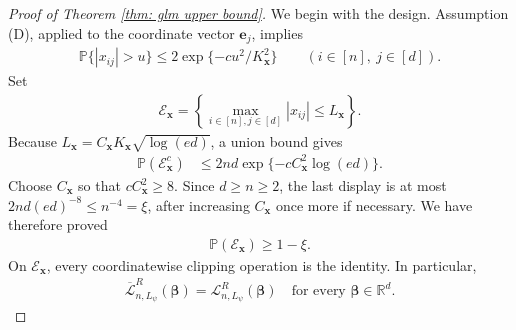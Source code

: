 \documentclass[letterpaper,12pt]{article}
\numberwithin{equation}{section}
\theoremstyle{plain}
\numberwithin{Theorem}{section}
\numberwithin{proposition}{section}
\numberwithin{Lemma}{section}
{
	\theoremstyle{definition}
	\newtheorem{Definition}{Definition}
	\newtheorem{example}{Example}
	\numberwithin{example}{section}
	\newtheorem{fact}{Fact}
	\numberwithin{fact}{section}
	\newtheorem{remark}{Remark}
}
\newcommand{\1}{\mathbbm{1}}
\def\bbeta{{\boldsymbol{\beta}}}
\def\Pr{\mathbb P}
\def\L{{\mathcal L}}
\begin{document}
\begin{proof}[Proof of Theorem \ref{thm: glm upper bound}]
We begin with the design.  Assumption (D), applied to the coordinate
vector \(\bm e_j\), implies
\begin{align*}
\Pr\{|x_{ij}|>u\}
\leq2\exp\{-cu^2/K_{\bm x}^2\}
\qquad(i\in[n],\ j\in[d]).
\end{align*}
Set
\begin{align*}
\mathcal E_{\bm x}
=\left\{\max_{i\in[n],j\in[d]}|x_{ij}|\leq L_{\bm x}\right\}.
\end{align*}
Because \(L_{\bm x}=C_{\bm x}K_{\bm x}\sqrt{\log(ed)}\), a union
bound gives
\begin{align*}
\Pr(\mathcal E_{\bm x}^c)
&\leq2nd\exp\{-cC_{\bm x}^2\log(ed)\}.
\end{align*}
Choose \(C_{\bm x}\) so that \(cC_{\bm x}^2\geq8\).  Since
\(d\geq n\geq2\), the last display is at most
\(2nd(ed)^{-8}\leq n^{-4}=\xi\), after increasing
\(C_{\bm x}\) once more if necessary.  We have therefore proved
\begin{align}
\Pr(\mathcal E_{\bm x})\geq1-\xi.                         \label{eq: repaired sparse no covariate clipping}
\end{align}
On \(\mathcal E_{\bm x}\), every coordinatewise clipping operation is
the identity.  In particular,
\begin{align}
\overline\L_{n,L_\psi}^R(\bbeta)=\L_{n,L_\psi}^R(\bbeta)
\quad\text{for every }\bbeta\in\mathbb R^d.              \label{eq: sparse clipped loss coupling}
\end{align}


\end{proof}
\end{document}
